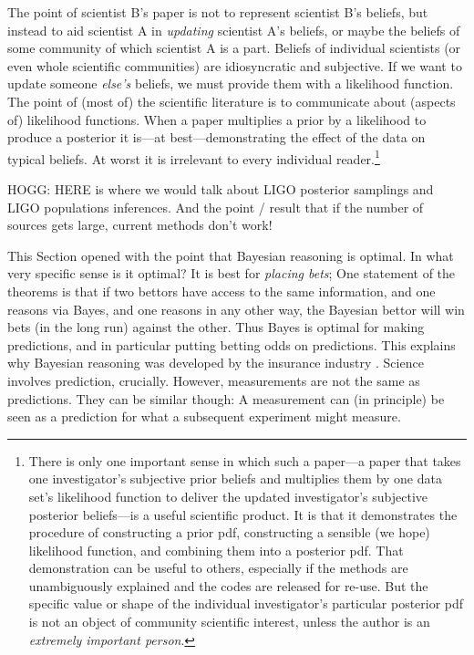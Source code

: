 \documentclass{article}
\newcommand{\sectionname}{Section}
\begin{document}
The point of scientist B's paper is not to represent scientist B's beliefs, but instead to aid scientist A in \emph{updating} scientist A's beliefs, or maybe the beliefs of some community of which scientist A is a part.
Beliefs of individual scientists (or even whole scientific communities) are idiosyncratic and subjective.
If we want to update someone \emph{else's} beliefs, we must provide them with a likelihood function.
The point of (most of) the scientific literature is to communicate about (aspects of) likelihood functions.
When a paper multiplies a prior by a likelihood to produce a posterior it is---at best---demonstrating the effect of the data on typical beliefs.
At worst it is irrelevant to every individual reader.\footnote{%
There is only one important sense in which such a paper---a paper that takes one investigator's subjective prior beliefs and multiplies them by one data set's likelihood function to deliver the updated investigator's subjective posterior beliefs---is a useful scientific product.
It is that it demonstrates the procedure of constructing a prior pdf, constructing a sensible (we hope) likelihood function, and combining them into a posterior pdf.
That demonstration can be useful to others, especially if the methods are unambiguously explained and the codes are released for re-use.
But the specific value or shape of the individual investigator's particular posterior pdf is not an object of community scientific interest, unless the author is an \emph{extremely important person}.}

HOGG: HERE is where we would talk about LIGO posterior samplings and LIGO populations inferences.
And the point / result that if the number of sources gets large, current methods don't work!

This \sectionname{} opened with the point that Bayesian reasoning is optimal.
In what very specific sense is it optimal?
It is best for \emph{placing bets};
One statement of the theorems is that if two bettors have access to the same information, and one reasons via Bayes, and one reasons in any other way, the Bayesian bettor will win bets (in the long run) against the other.
Thus Bayes is optimal for making predictions, and in particular putting betting odds on predictions.
This explains why Bayesian reasoning was developed by the insurance industry \cite{bayesactuary}.
Science involves prediction, crucially.
However, measurements are not the same as predictions.
They can be similar though: A measurement can (in principle) be seen as a prediction for what a subsequent experiment might measure.
\end{document}

